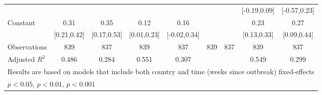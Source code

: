 \begin{table}[htbp]
\begin{tabular}{l*{8}{c}}
                    &               &               &               &               &               &               &[-0.19,0.09]         &[-0.57,0.23]         \\
[1em]
Constant            &  0.31\sym{***}&  0.35\sym{***}&  0.12\sym{*}  &  0.16         &               &               &  0.23\sym{***}&  0.27\sym{**} \\
                    &[0.21,0.42]         &[0.17,0.53]         &[0.01,0.23]         &[-0.02,0.34]         &               &               &[0.13,0.33]         &[0.09,0.44]         \\
\hline
Observations        &   839         &   837         &   839         &   837         &   839         &   837         &   839         &   837         \\
Adjusted \(R^{2}\)  & 0.486         & 0.284         & 0.551         & 0.307         &               &               & 0.549         & 0.299         \\
\hline\hline
\multicolumn{9}{l}{\footnotesize Results are based on models that include both country and time (weeks since outbreak) fixed-effects}\\
\multicolumn{9}{l}{\footnotesize \sym{*} \(p<0.05\), \sym{**} \(p<0.01\), \sym{***} \(p<0.001\)}\\
\end{tabular}
\end{table}
